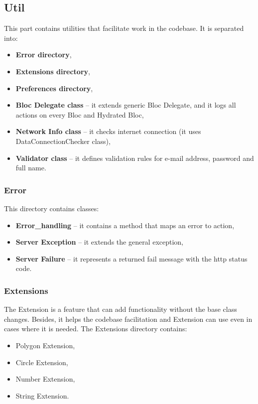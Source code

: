 \subsection{Util}\label{subsec:util}
This part contains utilities that facilitate work in the codebase.
It is separated into:
\begin{itemize}
    \item \textbf{Error directory},
    \item \textbf{Extensions directory},
    \item \textbf{Preferences directory},
    \item \textbf{Bloc Delegate class} -- it extends generic Bloc Delegate, and it logs all actions on every Bloc and Hydrated Bloc,
    \item \textbf{Network Info class} -- it checks internet connection (it uses DataConnectionChecker class),
    \item \textbf{Validator class} -- it defines validation rules for e-mail address, password and full name.
\end{itemize}


\subsubsection{Error}\label{subsubsec:error}
This directory contains classes:
\begin{itemize}
    \item \textbf{Error\_handling} -- it contains a method that maps an error to action,
    \item \textbf{Server Exception} -- it extends the general exception,
    \item \textbf{Server Failure} -- it represents a returned fail message with the \acrshort{http} status code.
\end{itemize}


\subsubsection{Extensions}\label{subsubsec:extensions}
The Extension is a feature that can add functionality without the base class changes.
Besides, it helps the codebase facilitation and Extension can use even in cases where it is needed.
The Extensions directory contains:
\begin{itemize}
    \item Polygon Extension,
    \item Circle Extension,
    \item Number Extension,
    \item String Extension.
\end{itemize}


